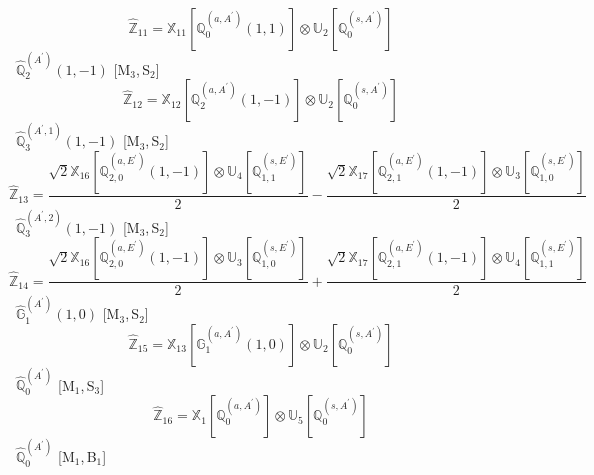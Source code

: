 \documentclass[fleqn,10pt,landscape]{article}
\begin{document}
\begin{itemize}
\begin{dmath*}
\hat{\mathbb{Z}}_{11}=\mathbb{X}_{11}[\mathbb{Q}_{0}^{(a,A^{\prime})}(1,1)] \otimes\mathbb{U}_{2}[\mathbb{Q}_{0}^{(s,A^{\prime})}]
\end{dmath*}
\vspace{4mm}
\noindent {} $\,\,\,\hat{\mathbb{Q}}_{2}^{(A^{\prime})}(1,-1)$ [M$_{3}$,\,S$_{2}$]
\begin{dmath*}
\hat{\mathbb{Z}}_{12}=\mathbb{X}_{12}[\mathbb{Q}_{2}^{(a,A^{\prime})}(1,-1)] \otimes\mathbb{U}_{2}[\mathbb{Q}_{0}^{(s,A^{\prime})}]
\end{dmath*}
\vspace{4mm}
\noindent {} $\,\,\,\hat{\mathbb{Q}}_{3}^{(A^{\prime},1)}(1,-1)$ [M$_{3}$,\,S$_{2}$]
\begin{dmath*}
\hat{\mathbb{Z}}_{13}=\frac{\sqrt{2} \mathbb{X}_{16}[\mathbb{Q}_{2,0}^{(a,E^{\prime})}(1,-1)] \otimes\mathbb{U}_{4}[\mathbb{Q}_{1,1}^{(s,E^{\prime})}]}{2} - \frac{\sqrt{2} \mathbb{X}_{17}[\mathbb{Q}_{2,1}^{(a,E^{\prime})}(1,-1)] \otimes\mathbb{U}_{3}[\mathbb{Q}_{1,0}^{(s,E^{\prime})}]}{2}
\end{dmath*}
\vspace{4mm}
\noindent {} $\,\,\,\hat{\mathbb{Q}}_{3}^{(A^{\prime},2)}(1,-1)$ [M$_{3}$,\,S$_{2}$]
\begin{dmath*}
\hat{\mathbb{Z}}_{14}=\frac{\sqrt{2} \mathbb{X}_{16}[\mathbb{Q}_{2,0}^{(a,E^{\prime})}(1,-1)] \otimes\mathbb{U}_{3}[\mathbb{Q}_{1,0}^{(s,E^{\prime})}]}{2} + \frac{\sqrt{2} \mathbb{X}_{17}[\mathbb{Q}_{2,1}^{(a,E^{\prime})}(1,-1)] \otimes\mathbb{U}_{4}[\mathbb{Q}_{1,1}^{(s,E^{\prime})}]}{2}
\end{dmath*}
\vspace{4mm}
\noindent {} $\,\,\,\hat{\mathbb{G}}_{1}^{(A^{\prime})}(1,0)$ [M$_{3}$,\,S$_{2}$]
\begin{dmath*}
\hat{\mathbb{Z}}_{15}=\mathbb{X}_{13}[\mathbb{G}_{1}^{(a,A^{\prime})}(1,0)] \otimes\mathbb{U}_{2}[\mathbb{Q}_{0}^{(s,A^{\prime})}]
\end{dmath*}
\vspace{4mm}
\noindent {} $\,\,\,\hat{\mathbb{Q}}_{0}^{(A^{\prime})}$ [M$_{1}$,\,S$_{3}$]
\begin{dmath*}
\hat{\mathbb{Z}}_{16}=\mathbb{X}_{1}[\mathbb{Q}_{0}^{(a,A^{\prime})}] \otimes\mathbb{U}_{5}[\mathbb{Q}_{0}^{(s,A^{\prime})}]
\end{dmath*}
\vspace{4mm}
\noindent {} $\,\,\,\hat{\mathbb{Q}}_{0}^{(A^{\prime})}$ [M$_{1}$,\,B$_{1}$]
\begin{dmath*}

\end{dmath*}
\end{itemize}
\end{document}
